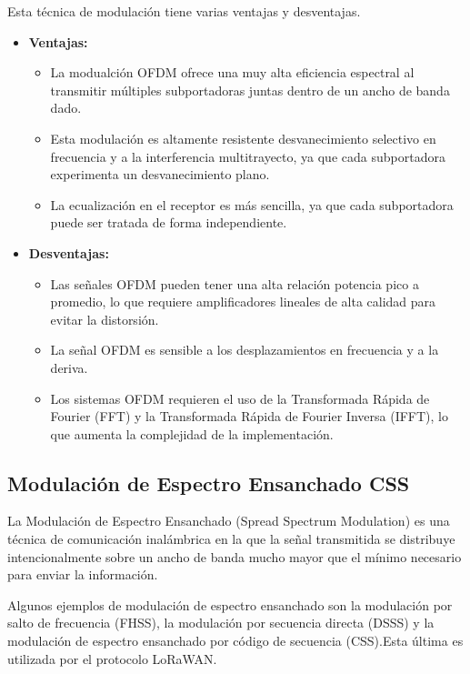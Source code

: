\documentclass[12pt, letterpaper]{article}
\begin{document}
Esta técnica de modulación tiene varias ventajas y desventajas.
\begin{itemize}
    \item \textbf{Ventajas:}
    \begin{itemize}
        \item La modualción OFDM ofrece una muy alta eficiencia espectral al transmitir múltiples subportadoras juntas dentro de un ancho de banda dado.
        \item Esta modulación es altamente resistente desvanecimiento selectivo en frecuencia y a la interferencia multitrayecto, ya que cada subportadora experimenta un desvanecimiento plano.
        \item La ecualización en el receptor es más sencilla, ya que cada subportadora puede ser tratada de forma independiente.
    \end{itemize}

    \item \textbf{Desventajas:}
    \begin{itemize}
        \item Las señales OFDM pueden tener una alta relación potencia pico a promedio, lo que requiere amplificadores lineales de alta calidad para evitar la distorsión.
        \item La señal OFDM es sensible a los desplazamientos en frecuencia y a la deriva.
        \item Los sistemas OFDM requieren el uso de la Transformada Rápida de Fourier (FFT) y la Transformada Rápida de Fourier Inversa (IFFT), lo que aumenta la complejidad de la implementación.
    \end{itemize}
\end{itemize}

\subsection{Modulación de Espectro Ensanchado CSS}

La Modulación de Espectro Ensanchado (Spread Spectrum Modulation) es una técnica de comunicación inalámbrica en la que la señal transmitida se distribuye intencionalmente sobre un ancho de banda mucho mayor que el mínimo necesario para enviar la información.

Algunos ejemplos de modulación de espectro ensanchado son la modulación por salto de frecuencia (FHSS), la modulación por secuencia directa (DSSS) y la modulación de espectro ensanchado por código de secuencia (CSS).\@ Esta última es utilizada por el protocolo LoRaWAN.\@
\end{document}

